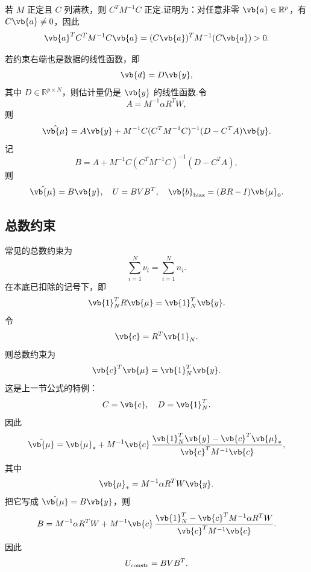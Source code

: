 \begin{notes}
	若 \(M\) 正定且 \(C\) 列满秩，则 \(C^TM^{-1}C\) 正定.证明为：对任意非零 \(\vb{a}\in\mathbb{R}^p\)，有 \(C\vb{a}\neq0\)，因此
	\begin{equation*}
		\vb{a}^TC^TM^{-1}C\vb{a}
		=(C\vb{a})^TM^{-1}(C\vb{a})>0.
	\end{equation*}
\end{notes}

若约束右端也是数据的线性函数，即
\begin{equation*}
	\vb{d}=D\vb{y},
\end{equation*}
其中 \(D\in\mathbb{R}^{p\times N}\)，则估计量仍是 \(\vb{y}\) 的线性函数.令
\begin{equation*}
	A=M^{-1}\alpha R^TW,
\end{equation*}
则
\begin{equation*}
	\hat{\vb{\mu}}
	=
	A\vb{y}
	+M^{-1}C(C^TM^{-1}C)^{-1}(D-C^TA)\vb{y}.
\end{equation*}
记
\begin{equation*}
	B
	=A
	+M^{-1}C(C^TM^{-1}C)^{-1}(D-C^TA),
\end{equation*}
则
\begin{equation*}
	\hat{\vb{\mu}}=B\vb{y},\quad
	U=BVB^T,\quad
	\vb{b}_{\rm bias}=(BR-I)\vb{\mu}_0.
\end{equation*}

\subsection{总数约束}

常见的总数约束为
\begin{equation*}
	\sum_{i=1}^{N}\nu_i=\sum_{i=1}^{N}n_i.
\end{equation*}
在本底已扣除的记号下，即
\begin{equation*}
	\vb{1}_N^TR\vb{\mu}=\vb{1}_N^T\vb{y}.
\end{equation*}
令
\begin{equation*}
	\vb{c}=R^T\vb{1}_N.
\end{equation*}
则总数约束为
\begin{equation*}
	\vb{c}^T\vb{\mu}=\vb{1}_N^T\vb{y}.
\end{equation*}
这是上一节公式的特例：
\begin{equation*}
	C=\vb{c},\quad D=\vb{1}_N^T.
\end{equation*}
因此
\begin{equation*}
	\hat{\vb{\mu}}
	=
	\vb{\mu}_*
	+M^{-1}\vb{c}\,
	\frac{\vb{1}_N^T\vb{y}-\vb{c}^T\vb{\mu}_*}
	{\vb{c}^TM^{-1}\vb{c}},
\end{equation*}
其中
\begin{equation*}
	\vb{\mu}_*=M^{-1}\alpha R^TW\vb{y}.
\end{equation*}
把它写成 \(\hat{\vb{\mu}}=B\vb{y}\)，则
\begin{equation*}
	B
	=M^{-1}\alpha R^TW
	+M^{-1}\vb{c}\,
	\frac{\vb{1}_N^T-\vb{c}^TM^{-1}\alpha R^TW}
	{\vb{c}^TM^{-1}\vb{c}}.
\end{equation*}
因此
\begin{equation*}
	U_{\rm constr}=BVB^T.
\end{equation*}

